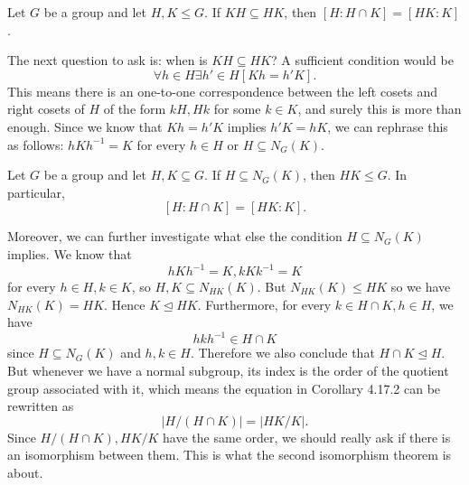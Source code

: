 \documentclass[pmath347]{subfiles}
\begin{document}
    \begin{cor}{}
        Let $G$ be a group and let $H,K\leq G$. If $KH\subseteq HK$, then $\left[ H:H\cap K \right] = \left[ HK:K \right]$.
    \end{cor}	

    \noindent The next question to ask is: when is $KH\subseteq HK$? A sufficient condition would be
    \begin{equation*}
        \forall h\in H\exists h'\in H\left[ Kh=h'K \right] .
    \end{equation*}
    This means there is an one-to-one correspondence between the left cosets and right cosets of $H$ of the form $kH, Hk$ for some $k\in K$, and surely this is more than enough. Since we know that $Kh = h'K$ implies $h'K=hK$, we can rephrase this as follows: $hKh^{-1} = K$ for every $h\in H$ or $H\subseteq N_G\left( K \right)$.

    \begin{cor}{}
        Let $G$ be a group and let $H,K\subseteq G$. If $H\subseteq N_G\left( K \right)$, then $HK\leq G$. In particular,
        \begin{equation*}
            \left[ H:H\cap K \right] = \left[ HK:K \right] .
        \end{equation*}
    \end{cor}	

    \noindent Moreover, we can further investigate what else the condition $H\subseteq N_G\left( K \right)$ implies. We know that
    \begin{equation*}
        hKh^{-1} = K, kKk^{-1} = K
    \end{equation*}
    for every $h\in H, k\in K$, so $H,K\subseteq N_{HK}\left( K \right)$. But $N_{HK}\left( K \right) \leq HK$ so we have $N_{HK}\left( K \right) = HK$. Hence $K\trianglelefteq HK$. Furthermore, for every $k\in H\cap K, h\in H$, we have
    \begin{equation*}
        hkh^{-1} \in H\cap K
    \end{equation*}
    since $H\subseteq N_G\left( K \right)$ and $h,k\in H$. Therefore we also conclude that $H\cap K\trianglelefteq H$. But whenever we have a normal subgroup, its index is the order of the quotient group associated with it, which means the equation in Corollary 4.17.2 can be rewritten as
    \begin{equation*}
        \left| H / \left( H\cap K \right)  \right| = \left| HK /K \right| .
    \end{equation*}
    Since $H / \left( H\cap K \right) , HK /K$ have the same order, we should really ask if there is an isomorphism between them. This is what the second isomorphism theorem is about.
\end{document}
